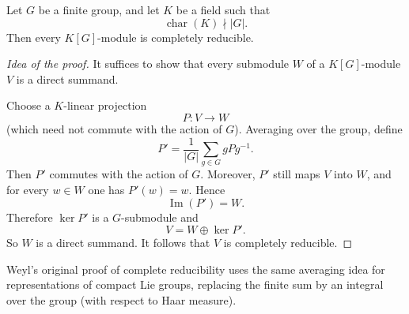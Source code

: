 
\begin{remark}
    Let \(G\) be a finite group, and let \(K\) be a field such that
    \[
        \operatorname{char}(K)\nmid |G|.
    \]
    Then every \(K[G]\)-module is completely reducible.
\end{remark}

\begin{proof}[Idea of the proof]
    It suffices to show that every submodule \(W\) of a \(K[G]\)-module \(V\)
    is a direct summand.

    Choose a \(K\)-linear projection
    \[
        P\colon V\to W
    \]
    (which need not commute with the action of \(G\)). Averaging over the group,
    define
    \[
        P'=\frac{1}{|G|}\sum_{g\in G} gPg^{-1}.
    \]
    Then \(P'\) commutes with the action of \(G\). Moreover, \(P'\) still maps
    \(V\) into \(W\), and for every \(w\in W\) one has \(P'(w)=w\). Hence
    \[
        \operatorname{Im}(P')=W.
    \]
    Therefore \(\ker P'\) is a \(G\)-submodule and
    \[
        V=W\oplus \ker P'.
    \]
    So \(W\) is a direct summand. It follows that \(V\) is completely reducible.
\end{proof}

\begin{remark}
    Weyl's original proof of complete reducibility uses the same averaging idea
    for representations of compact Lie groups, replacing the finite sum by an
    integral over the group (with respect to Haar measure).
\end{remark}

